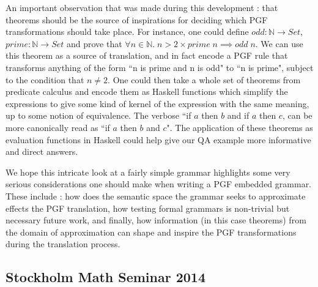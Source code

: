 An important observation that was made during this development : that theorems
should be the source of inspirations for deciding which PGF transformations
should take place. For instance, one could define $odd : \mathds{N}
\rightarrow Set$, $prime : \mathds{N} \rightarrow Set$ and prove that $\forall n
\in \mathds{N}.\; n > 2 \times prime\; n \implies odd\; n$. We can use this
theorem as a source of translation, and in fact encode a PGF rule that
transforms anything of the form ``n is prime and n is odd" to ``n is prime",
subject to the condition that $n \neq 2$. One could then take a whole set of
theorems from predicate calculus and encode them as Haskell functions which
simplify the expressions to give some kind of kernel of the expression with the
same meaning, up to some notion of equivalence. The verbose ``if $a$ then $b$
and if $a$ then $c$, can be more canonically read as ``if $a$ then $b$ and $c$".
The application of these theorems as evaluation functions in Haskell could
help give our QA example more informative and direct answers.

We hope this intricate look at a fairly simple grammar highlights some very
serious considerations one should make when writing a PGF embedded grammar.
These include : how does the semantic space the grammar seeks to approximate
effects the PGF translation, how testing formal grammars is non-trivial but
necessary future work, and finally, how information (in this case theorems) from
the domain of approximation can shape and inspire the PGF transformations 
during the translation process.



\subsection{Stockholm Math Seminar 2014}

